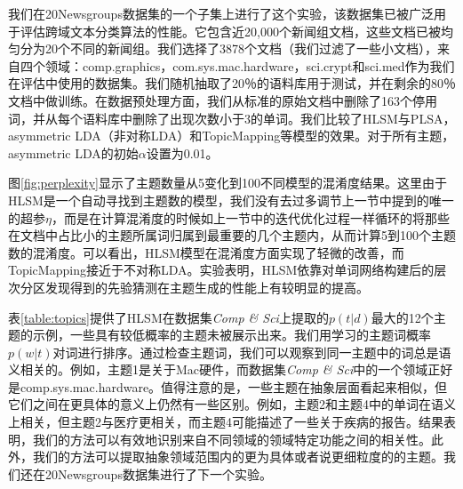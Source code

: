 我们在20Newsgroups数据集的一个子集上进行了这个实验，该数据集已被广泛用于评估跨域文本分类算法的性能。它包含近20,000个新闻组文档，这些文档已被均匀分为20个不同的新闻组。我们选择了3878个文档（我们过滤了一些小文档），来自四个领域：comp.graphics，com.sys.mac.hardware，sci.crypt和sci.med作为我们在评估中使用的数据集。我们随机抽取了20％的语料库用于测试，并在剩余的80％文档中做训练。在数据预处理方面，我们从标准的原始文档中删除了163个停用词，并从每个语料库中删除了出现次数小于3的单词。我们比较了HLSM与PLSA，asymmetric LDA（非对称LDA）和TopicMapping等模型的效果。对于所有主题，asymmetric LDA的初始$\alpha$设置为0.01。
 
图\ref{fig:perplexity}显示了主题数量从5变化到100不同模型的混淆度结果。这里由于HLSM是一个自动寻找到主题数的模型，我们没有去过多调节上一节中提到的唯一的超参$\eta$，而是在计算混淆度的时候如上一节中的迭代优化过程一样循环的将那些在文档中占比小的主题所属词归属到最重要的几个主题内，从而计算5到100个主题数的混淆度。可以看出，HLSM模型在混淆度方面实现了轻微的改善，而TopicMapping接近于不对称LDA。实验表明，HLSM依靠对单词网络构建后的层次分区发现得到的先验猜测在主题生成的性能上有较明显的提高。
 
表\ref{table:topics}提供了HLSM在数据集\emph{Comp \& Sci}上提取的$p(t|d)$最大的12个主题的示例，一些具有较低概率的主题未被展示出来。我们用学习的主题词概率$p(w|t)$对词进行排序。通过检查主题词，我们可以观察到同一主题中的词总是语义相关的。例如，主题1是关于Mac硬件，而数据集\emph{Comp \& Sci}中的一个领域正好是comp.sys.mac.hardware。值得注意的是，一些主题在抽象层面看起来相似，但它们之间在更具体的意义上仍然有一些区别。例如，主题2和主题4中的单词在语义上相关，但主题2与医疗更相关，而主题4可能描述了一些关于疾病的报告。结果表明，我们的方法可以有效地识别来自不同领域的领域特定功能之间的相关性。此外，我们的方法可以提取抽象领域范围内的更为具体或者说更细粒度的的主题。我们还在20Newsgroups数据集进行了下一个实验。

